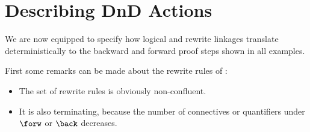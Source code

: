 




\section{Describing DnD Actions}

We are now equipped to specify how logical and rewrite linkages translate
deterministically to the backward and forward proof steps shown in all examples.

First some remarks can be made about the rewrite rules of :
\begin{itemize}
\item The set of rewrite rules is obviously non-confluent. 
\item It is also terminating, because the number of connectives or quantifiers
  under $\forw$ or $\back$ decreases.
\end{itemize}

